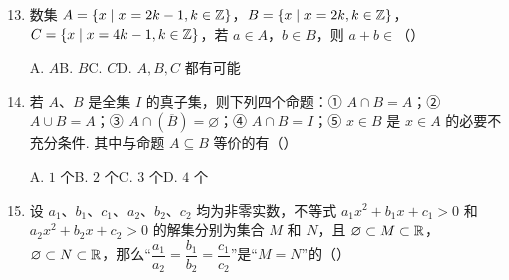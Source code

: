 \documentclass[a4paper,11pt]{article}
\begin{document}
\begin{enumerate}
\setcounter{enumi}{12}

\item 数集 $A=\{x\mid x=2k-1,k\in\mathbb{Z}\}$，$B=\{x\mid x=2k,k\in\mathbb{Z}\}$，$C=\{x\mid x=4k-1,k\in\mathbb{Z}\}$，若 $a\in A$，$b\in B$，则 $a+b\in$\mbox{（\quad）}

\keepwithprev
A. $A$\qquad B. $B$\qquad C. $C$\qquad D. $A,B,C$ 都有可能


\ifanswer
\solbegin
{}
\solend
\fi


\item 若 $A$、$B$ 是全集 $I$ 的真子集，则下列四个命题：① $A\cap B=A$；② $A\cup B=A$；③ $A\cap(\overline B)=\varnothing$；④ $A\cap B=I$；⑤ $x\in B$ 是 $x\in A$ 的必要不充分条件. 其中与命题 $A\subseteq B$ 等价的有\mbox{（\quad）}

\keepwithprev
A. $1$ 个\qquad B. $2$ 个\qquad C. $3$ 个\qquad D. $4$ 个


\ifanswer
\solbegin
{}
\solend
\fi


\item 设 $a_1$、$b_1$、$c_1$、$a_2$、$b_2$、$c_2$ 均为非零实数，不等式 $a_1x^2+b_1x+c_1>0$ 和 $a_2x^2+b_2x+c_2>0$ 的解集分别为集合 $M$ 和 $N$，且 $\varnothing\subset M\subset\mathbb{R}$，$\varnothing\subset N\subset\mathbb{R}$，那么“$\dfrac{a_1}{a_2}=\dfrac{b_1}{b_2}=\dfrac{c_1}{c_2}$”是“$M=N$”的\mbox{（\quad）}


\end{enumerate}
\end{document}
